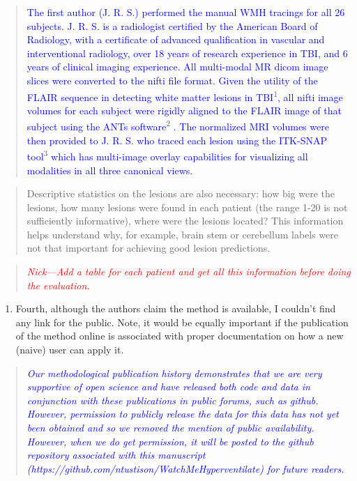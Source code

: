 \documentclass[12pt,]{article}
\providecommand{\tightlist}{%
  \setlength{\itemsep}{0pt}\setlength{\parskip}{0pt}}
\begin{document}
\begin{quote}
\textcolor{blue}{The first author (J. R. S.) performed the manual WMH tracings for all 26  subjects.  J. R. S. is a radiologist certified by the American Board of Radiology, with a certificate of advanced qualification in vascular and interventional radiology, over 18 years of research experience in TBI, and 6 years of clinical imaging experience.  All multi-modal MR dicom image slices were converted to the nifti file format. Given the utility of the FLAIR sequence in detecting white matter lesions in TBI}\textsuperscript{1}\textcolor{blue}{, all nifti image volumes for each subject were rigidly aligned to the FLAIR image of that subject using the ANTs software}\textsuperscript{2}
\textcolor{blue}{.  The normalized MRI volumes were then provided to J. R. S. who traced each lesion using the ITK-SNAP tool}\textsuperscript{3}
\textcolor{blue}{ which has multi-image overlay capabilities for visualizing all modalities in all three canonical views.}
\end{quote}

\begin{quote}
Descriptive statistics on the lesions are also necessary: how big were
the lesions, how many lesions were found in each patient (the range 1-20
is not sufficiently informative), where were the lesions located? This
information helps understand why, for example, brain stem or cerebellum
labels were not that important for achieving good lesion predictions.
\end{quote}

\begin{quote}
\emph{\textcolor{red}{Nick---Add a table for each patient and get all this
information before doing the evaluation.}}
\end{quote}

\begin{enumerate}
\def\labelenumi{\arabic{enumi}.}
\setcounter{enumi}{3}
\tightlist
\item
  Fourth, although the authors claim the method is available, I couldn't
  find any link for the public. Note, it would be equally important if
  the publication of the method online is associated with proper
  documentation on how a new (naive) user can apply it.
\end{enumerate}

\begin{quote}
\emph{\textcolor{blue}{Our methodological publication history demonstrates that we are
very supportive of open science and have released both code and data in conjunction
with these publications in public forums, such as github.  However, permission to
publicly release the data for this data has not yet been obtained and so we removed
the mention of public availability.  However, when we do get permission, it will
be posted to the github repository associated with this manuscript
(https://github.com/ntustison/WatchMeHyperventilate) for future readers.
}}
\end{quote}
\end{document}
